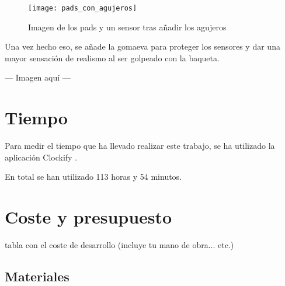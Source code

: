             \newpage

            \begin{figure}[ht]
                \centering
                \texttt{[image: pads\_con\_agujeros]}
                \caption{Imagen de los pads y un sensor tras añadir los agujeros\label{fig:PadsAgujeros}}
            \end{figure}

            Una vez hecho eso, se añade la gomaeva para proteger los sensores y dar una mayor sensación de realismo al
            ser golpeado con la baqueta.

            --- Imagen aquí ---



    \section{Tiempo} %
    \label{sec:Tiempo}

        Para medir el tiempo que ha llevado realizar este trabajo, se ha utilizado la aplicación
        Clockify \cite{clockify}.\newline

        En total se han utilizado 113 horas y 54 minutos.%


    \section{Coste y presupuesto} %
    \label{sec:CosteYPresupuesto}

        tabla con el coste de desarrollo (incluye tu mano de obra... etc.)

        \subsection{Materiales} %
        \label{sub:Materiales}

